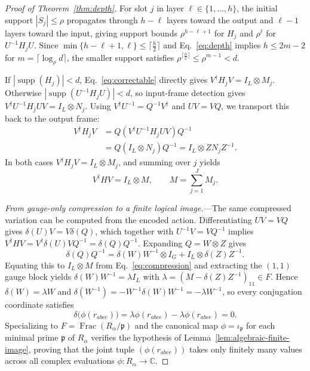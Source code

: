 \documentclass[aps,prl,reprint,longbibliography,nofootinbib,nobibnotes]{revtex4-2}
\newcommand{\id}{I}
\begin{document}
\begin{proof}[Proof of Theorem~\ref{thm:depth}]
For slot $j$ in layer $\ell\in\{1,\ldots,h\}$, the initial support $|S_j|\le\rho$
propagates through $h-\ell$ layers toward the output and $\ell-1$ layers toward the input, giving support bounds $\rho^{h-\ell+1}$ for $H_j$ and $\rho^\ell$ for $U^{-1}H_jU$. Since $\min\{h-\ell+1,\ell\}\le\lceil \frac{h}{2}\rceil$ and Eq.~\eqref{eq:depth} implies $h\le
2m-2$ for $m=\lceil\log_\rho d\rceil$, the smaller support satisfies $\rho^{\lceil
\frac{h}{2}\rceil}\le\rho^{m-1}<d$.

If $|\operatorname{supp}(H_j)|<d$, Eq.~\eqref{eq:correctable} directly gives $V^\dagger
H_jV=\id_L\otimes M_j$. Otherwise $|\operatorname{supp}(U^{-1}H_jU)|<d$, so input-frame detection
gives $V^\dagger U^{-1}H_jUV=\id_L\otimes N_j$. Using $V^\dagger U^{-1}=Q^{-1}V^\dagger$ and
$UV=VQ$, we transport this back to the output frame:
\begin{align*}
 V^\dagger H_jV &= Q(V^\dagger U^{-1}H_jUV)Q^{-1} \\
                &= Q(\id_L\otimes N_j)Q^{-1} = \id_L\otimes ZN_jZ^{-1}.
\end{align*}
In both cases $V^\dagger H_jV=\id_L\otimes M_j$, and summing over $j$ yields
\begin{equation}\label{eq:compression}
 V^\dagger HV=\id_L\otimes M,\qquad M=\sum_{j=1}^J M_j.
\end{equation}

\emph{From gauge-only compression to a finite logical image.}---The same compressed variation can
be computed from the encoded action. Differentiating $UV=VQ$ gives $\delta(U)V=V\delta(Q)$, which
together with $U^{-1}V=VQ^{-1}$ implies $V^\dagger HV=V^\dagger\delta(U)VQ^{-1}=\delta(Q)Q^{-1}$.
Expanding $Q=W\otimes Z$ gives
\begin{equation}\label{eq:logicalgen}
 \delta(Q)Q^{-1}
   =\delta(W)W^{-1}\otimes\id_G+\id_L\otimes\delta(Z)Z^{-1}.
\end{equation}
Equating this to $\id_L\otimes M$ from Eq.~\eqref{eq:compression} and extracting the $(1,1)$ gauge
block yields $\delta(W)W^{-1}=\lambda\id_L$ with $\lambda=(M-\delta(Z)Z^{-1})_{11}\in F$. Hence
$\delta(W)=\lambda W$ and $\delta(W^{-1})=-W^{-1}\delta(W)W^{-1}=-\lambda W^{-1}$, so every
conjugation coordinate satisfies
\[
 \delta\bigl(\phi(r_{abce})\bigr)
   =\lambda\phi(r_{abce})-\lambda\phi(r_{abce})=0.
\]
Specializing to $F=\operatorname{Frac}(R_\alpha/\mathfrak p)$ and the canonical map
$\phi=\iota_{\mathfrak p}$ for each minimal prime $\mathfrak p$ of $R_\alpha$ verifies the
hypothesis of Lemma~\ref{lem:algebraic-finite-image}, proving that the joint tuple
$(\phi(r_{abce}))$ takes only finitely many values across all complex evaluations
$\phi:R_\alpha\to\mathbb C$.


\end{proof}
\end{document}
